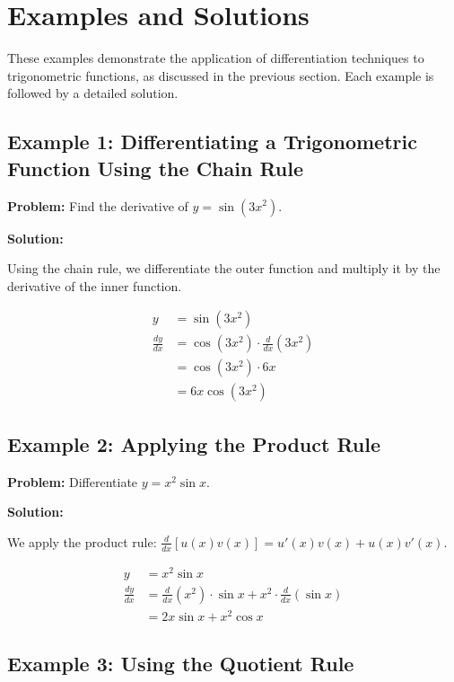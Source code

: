 \documentclass[a4paper,12pt]{book}
\newcounter{example}
\begin{document}
\section*{Examples and Solutions}

These examples demonstrate the application of differentiation techniques to trigonometric functions, as discussed in the previous section. Each example is followed by a detailed solution.

\subsection*{Example 1: Differentiating a Trigonometric Function Using the Chain Rule}

\textbf{Problem:} Find the derivative of \( y = \sin(3x^2) \).

\textbf{Solution:}

Using the chain rule, we differentiate the outer function and multiply it by the derivative of the inner function.

\begin{align*}
y &= \sin(3x^2) \\
\frac{dy}{dx} &= \cos(3x^2) \cdot \frac{d}{dx}(3x^2) \\
              &= \cos(3x^2) \cdot 6x \\
              &= 6x \cos(3x^2)
\end{align*}

\subsection*{Example 2: Applying the Product Rule}

\textbf{Problem:} Differentiate \( y = x^2 \sin x \).

\textbf{Solution:}

We apply the product rule: \(\frac{d}{dx}[u(x)v(x)] = u'(x)v(x) + u(x)v'(x)\).

\begin{align*}
y &= x^2 \sin x \\
\frac{dy}{dx} &= \frac{d}{dx}(x^2) \cdot \sin x + x^2 \cdot \frac{d}{dx}(\sin x) \\
              &= 2x \sin x + x^2 \cos x
\end{align*}

\subsection*{Example 3: Using the Quotient Rule}
\end{document}
